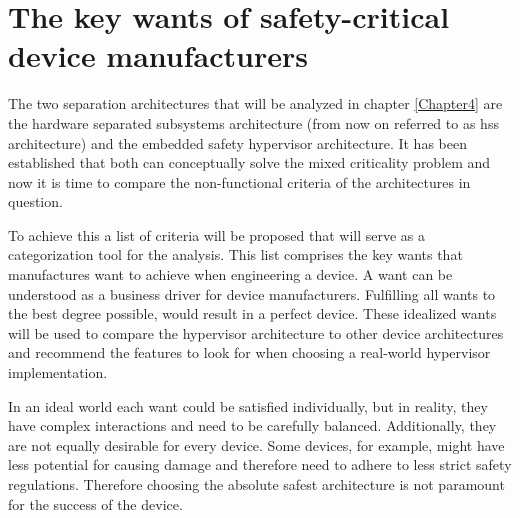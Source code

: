 
\chapter{The key wants of safety-critical device manufacturers} %

\label{Chapter3} %




The two separation architectures that will be analyzed in chapter \ref{Chapter4} are the hardware separated subsystems architecture (from now on referred to as \acrshort{hss} architecture) and the embedded safety hypervisor architecture. It has been established that both can conceptually solve the mixed criticality problem and now it is time to compare the non-functional criteria of the architectures in question. 

To achieve this a list of criteria will be proposed that will serve as a categorization tool for the analysis.
This list comprises the key wants that manufactures want to achieve when engineering a device. A want can be understood as a business driver for device manufacturers. Fulfilling all wants to the best degree possible, would result in a perfect device. These idealized wants will be used to compare the hypervisor architecture to other device architectures and recommend the features to look for when choosing a real-world hypervisor implementation.

In an ideal world each want could be satisfied individually, but in reality, they have complex interactions and need to be carefully balanced. 
Additionally, they are not equally desirable for every device. Some devices, for example, might have less potential for causing damage and therefore need to adhere to less strict safety regulations. Therefore choosing the absolute safest architecture is not paramount for the success of the device.

